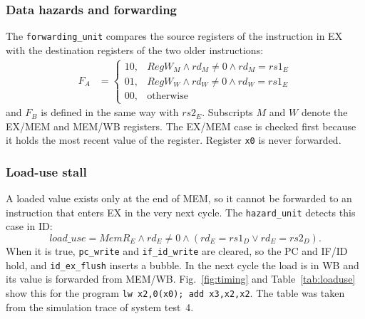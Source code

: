 \subsubsection{Data hazards and forwarding}
The \texttt{forwarding\_unit} compares the source registers of the instruction in EX with
the destination registers of the two older instructions:
\begin{align}
F_A &= \begin{cases}
10, & RegW_{M} \land rd_{M}\neq 0 \land rd_{M} = rs1_{E}\\
01, & RegW_{W} \land rd_{W}\neq 0 \land rd_{W} = rs1_{E}\\
00, & \text{otherwise}
\end{cases}
\end{align}
and $F_B$ is defined in the same way with $rs2_E$. Subscripts $M$ and $W$ denote the
EX/MEM and MEM/WB registers. The EX/MEM case is checked first because it holds the most
recent value of the register. Register \texttt{x0} is never forwarded.

\subsubsection{Load-use stall}
A loaded value exists only at the end of MEM, so it cannot be forwarded to an instruction
that enters EX in the very next cycle. The \texttt{hazard\_unit} detects this case in ID:
\begin{equation}
load\_use = MemR_E \land rd_E \neq 0 \land (rd_E = rs1_D \lor rd_E = rs2_D).
\end{equation}
When it is true, \texttt{pc\_write} and \texttt{if\_id\_write} are cleared, so the PC and
IF/ID hold, and \texttt{id\_ex\_flush} inserts a bubble. In the next cycle the load is in
WB and its value is forwarded from MEM/WB. Fig.~\ref{fig:timing} and
Table~\ref{tab:loaduse} show this for the program
\texttt{lw x2,0(x0); add x3,x2,x2}. The table was taken from the simulation trace of
system test~4.

